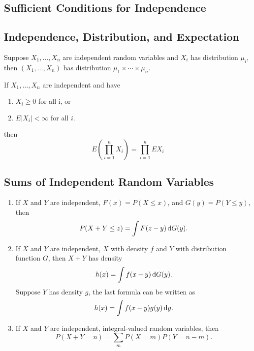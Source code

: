 \subsection{Sufficient Conditions for Independence}

\subsection{Independence, Distribution, and Expectation}

\begin{theorem}
	Suppose \(X_{1},\ldots,X_{n}\) are independent random variables and \(X_{i}\) has distribution \(\mu_{i}\), then \(\left(X_{1},\ldots,X_{n}\right)\) has distribution \(\mu_{1}\times\cdots\times\mu_{n}\).
\end{theorem}

\begin{theorem}
	If \(X_{1},\ldots,X_{n}\) are independent and have
	\begin{enumerate}
		\item \(X_{i} \geq 0\) for all i, or
		\item \(E\left|X_{i}\right|<\infty\) for all \(i\).
	\end{enumerate}
	then
	\begin{equation}
		E\left(\prod_{i=1}^{n}X_{i}\right)=\prod_{i=1}^{n}EX_{i}
	\end{equation}
\end{theorem}

\subsection{Sums of Independent Random Variables}

\begin{theorem}
	\begin{enumerate}
		\item If \(X\) and \(Y\) are independent, \(F(x)=P(X\leq x)\), and \(G(y)=P(Y\leq y)\), then
		      \begin{equation}
			      P(X+Y\leq z)=\int F(z-y)\mathop{}\!\mathrm{d} G(y).
		      \end{equation}
		\item If \(X\) and \(Y\) are independent,  \(X\) with density \(f\) and \(Y\) with distribution function \(G\), then \(X+Y\) has density
		      \begin{equation}
			      h(x)=\int f(x-y)\mathop{}\!\mathrm{d} G(y).
		      \end{equation}
		      Suppose \(Y\) has density \(g\), the last formula can be written as
		      \begin{equation}
			      h(x)=\int f(x-y)g(y)\mathop{}\!\mathrm{d} y.
		      \end{equation}
		\item If \(X\) and \(Y\) are independent, integral-valued random variables, then
		      \begin{equation}
			      P(X+Y=n)=\sum_{m}P(X=m)P(Y=n-m).
		      \end{equation}
	\end{enumerate}
\end{theorem}

